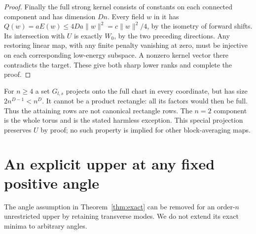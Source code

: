 \documentclass[11pt,a4paper]{article}
\newcommand{\norm}[1]{\lVert#1\rVert}
\begin{document}
\begin{proof}
Finally the full strong kernel consists of constants on each connected
component and has dimension $Dn$. Every field $w$ in it has
$Q(w)=aE(w)\leq4Da\norm w^2=c\norm w^2/4$, by the isometry of forward
shifts. Its intersection with $U$ is exactly $W_0$, by the two preceding
directions. Any restoring linear map, with any finite penalty vanishing at
zero, must be injective on each corresponding low-energy subspace. A nonzero
kernel vector there contradicts the target. These give both sharp lower
ranks and complete the proof.
\end{proof}

For $n\geq4$ a set $G_{l,s}$ projects onto the full chart in every coordinate,
but has size $2n^{D-1}<n^D$. It cannot be a product rectangle: all its factors
would then be full. Thus the attaining rows are not canonical rectangle rows.
The $n=2$ component is the whole torus and is the stated harmless exception.
This special projection preserves $U$ by proof; no such property is implied
for other block-averaging maps.

\section{An explicit upper at any fixed positive angle}
The angle assumption in Theorem~\ref{thm:exact} can be removed for an
order-$n$ unrestricted upper by retaining transverse modes. We do not extend
its exact minima to arbitrary angles.
\end{document}
